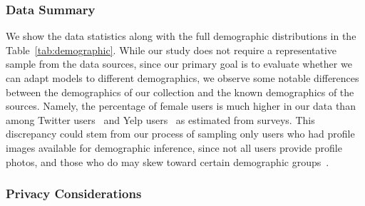 \subsubsection{Data Summary}
We show the data statistics along with the full demographic distributions in the Table~\ref{tab:demographic}.
While our study does not require a representative sample from the data sources,
since our primary goal is to evaluate whether we can adapt models to different demographics,
we observe some notable differences between the demographics of our collection and the known demographics of the sources.
Namely, the percentage of female users is much higher in our data than among Twitter users~\cite{tien_2018} and Yelp users~\cite{yelp_2018} as estimated from surveys. 
This discrepancy could stem from our process of sampling only users who had profile images available for demographic inference,
since not all users provide profile photos,
and those who do may skew toward certain demographic groups~\cite{rose2012face}.





\subsubsection{Privacy Considerations}

